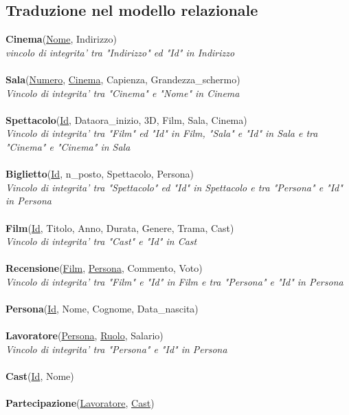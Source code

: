 \documentclass[10pt]{article}
\begin{document}
	\subsection{Traduzione nel modello relazionale}
	\textbf{Cinema}(\underline{Nome}, Indirizzo)\\
	\textit{vincolo di integrita' tra "Indirizzo" ed "Id" in Indirizzo}\\\\
	\textbf{Sala}(\underline{Numero}, \underline{Cinema}, Capienza, Grandezza\_schermo)\\
	\textit{Vincolo di integrita' tra "Cinema" e "Nome" in Cinema}\\\\
	\textbf{Spettacolo}(\underline{Id}, Dataora\_inizio, 3D, Film, Sala, Cinema)\\
	\textit{Vincolo di integrita' tra "Film" ed "Id" in Film, "Sala" e "Id" in Sala e tra "Cinema" e "Cinema" in Sala}\\\\
	\textbf{Biglietto}(\underline{Id}, n\_posto, Spettacolo, Persona)\\
	\textit{Vincolo di integrita' tra "Spettacolo" ed "Id" in Spettacolo e tra "Persona" e "Id" in Persona}\\\\
	\textbf{Film}(\underline{Id}, Titolo, Anno, Durata, Genere, Trama, Cast)\\
	\textit{Vincolo di integrita' tra "Cast" e "Id" in Cast}\\\\
	\textbf{Recensione}(\underline{Film}, \underline{Persona}, Commento, Voto)\\
	\textit{Vincolo di integrita' tra "Film" e "Id" in Film e tra "Persona" e "Id" in Persona}\\\\
	\textbf{Persona}(\underline{Id}, Nome, Cognome, Data\_nascita)\\\\
	\textbf{Lavoratore}(\underline{Persona}, \underline{Ruolo}, Salario)\\
	\textit{Vincolo di integrita' tra "Persona" e "Id" in Persona}\\\\
	\textbf{Cast}(\underline{Id}, Nome)\\\\
	\textbf{Partecipazione}(\underline{Lavoratore}, \underline{Cast})
\end{document}
